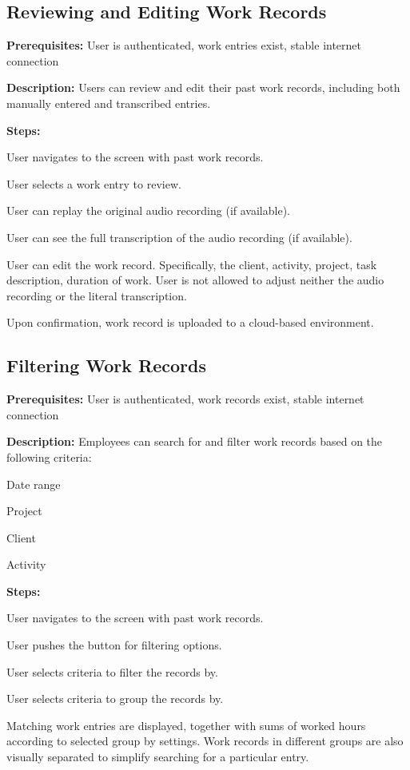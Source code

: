 \documentclass[
  digital,     %
  oneside,     %
  nosansbold,  %
  nocolorbold, %
  lof,         %
  lot,         %
]{fithesis4}
\begin{document}
\subsection{Reviewing and Editing Work Records}

\noindent \textbf{Prerequisites:} User is authenticated, work entries exist, stable internet connection

\noindent \textbf{Description:}  
Users can review and edit their past work records, including both manually entered and transcribed entries.

\noindent \textbf{Steps:}
\begin{compactenum}
    \item User navigates to the screen with past work records.
    \item User selects a work entry to review.
    \item User can replay the original audio recording (if available).
    \item User can see the full transcription of the audio recording (if available).
    \item User can edit the work record. Specifically, the client, activity, project, task description, duration of work. User is not allowed to adjust neither the audio recording or the literal transcription.
    \item Upon confirmation, work record is uploaded to a cloud-based environment.
\end{compactenum}

\subsection{Filtering Work Records}

\noindent \textbf{Prerequisites:} User is authenticated, work records exist, stable internet connection

\noindent \textbf{Description:}  
Employees can search for and filter work records based on the following criteria:
\begin{compactitem}
    \item Date range
    \item Project
    \item Client
    \item Activity
\end{compactitem}

\noindent \textbf{Steps:}
\begin{compactenum}
    \item User navigates to the screen with past work records.
    \item User pushes the button for filtering options.
    \item User selects criteria to filter the records by.
    \item User selects criteria to group the records by.
    \item Matching work entries are displayed, together with sums of worked hours according to selected group by settings. Work records in different groups are also visually separated to simplify searching for a particular entry. 
\end{compactenum}
\end{document}
